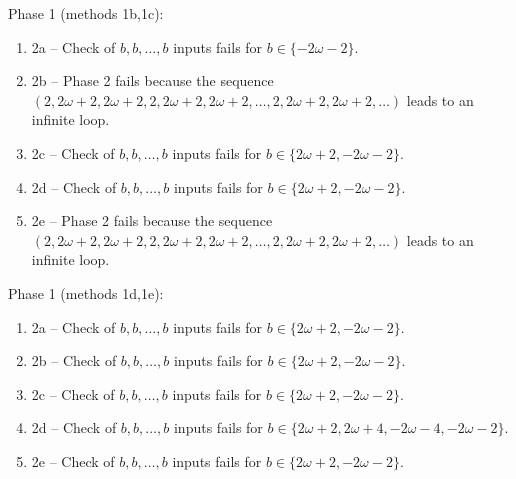 \begin{exmp}
Phase 1 (methods 1b,\allowbreak  1c):
\begin{enumerate}[ ]
\item  2a -- Check of $b,\allowbreak b,\allowbreak \dots,\allowbreak b$ inputs fails for $b\in \{-2\omega - 2\}$.
\item  2b -- Phase 2   fails because  the sequence $(2,\allowbreak  2\omega + 2,\allowbreak  2\omega + 2,\allowbreak  2,\allowbreak  2\omega + 2,\allowbreak  2\omega + 2,\allowbreak  \dots ,\allowbreak 2,\allowbreak  2\omega + 2,\allowbreak  2\omega + 2,\allowbreak  \dots)$ leads to an infinite loop.
\item  2c -- Check of $b,\allowbreak b,\allowbreak \dots,\allowbreak b$ inputs fails for $b\in \{2\omega + 2,\allowbreak  -2\omega - 2\}$.
\item  2d -- Check of $b,\allowbreak b,\allowbreak \dots,\allowbreak b$ inputs fails for $b\in \{2\omega + 2,\allowbreak  -2\omega - 2\}$.
\item  2e -- Phase 2   fails because  the sequence $(2,\allowbreak  2\omega + 2,\allowbreak  2\omega + 2,\allowbreak  2,\allowbreak  2\omega + 2,\allowbreak  2\omega + 2,\allowbreak  \dots ,\allowbreak 2,\allowbreak  2\omega + 2,\allowbreak  2\omega + 2,\allowbreak  \dots)$ leads to an infinite loop.
\end{enumerate}


Phase 1 (methods 1d,\allowbreak  1e):
\begin{enumerate}[ ]
\item  2a -- Check of $b,\allowbreak b,\allowbreak \dots,\allowbreak b$ inputs fails for $b\in \{2\omega + 2,\allowbreak  -2\omega - 2\}$.
\item  2b -- Check of $b,\allowbreak b,\allowbreak \dots,\allowbreak b$ inputs fails for $b\in \{2\omega + 2,\allowbreak  -2\omega - 2\}$.
\item  2c -- Check of $b,\allowbreak b,\allowbreak \dots,\allowbreak b$ inputs fails for $b\in \{2\omega + 2,\allowbreak  -2\omega - 2\}$.
\item  2d -- Check of $b,\allowbreak b,\allowbreak \dots,\allowbreak b$ inputs fails for $b\in \{2\omega + 2,\allowbreak  2\omega + 4,\allowbreak  -2\omega - 4,\allowbreak  -2\omega - 2\}$.
\item  2e -- Check of $b,\allowbreak b,\allowbreak \dots,\allowbreak b$ inputs fails for $b\in \{2\omega + 2,\allowbreak  -2\omega - 2\}$.
\end{enumerate}


\end{exmp}




